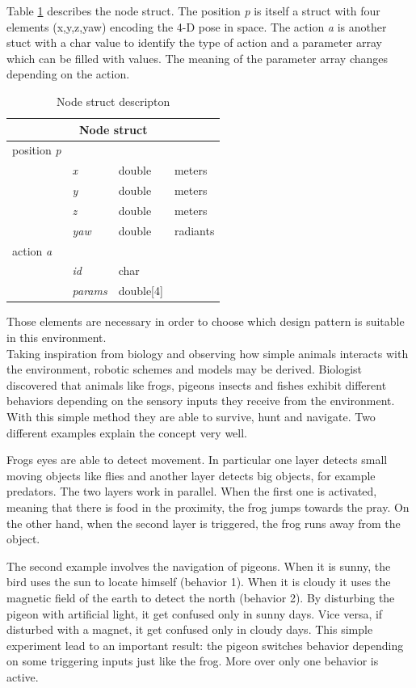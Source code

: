 Table \ref{tab:node} describes the node struct. The position \textit{p} is itself a struct with four elements (x,y,z,yaw) encoding the 4-D pose in space. The action \textit{a} is another stuct with a char value to identify the type of action and a parameter array which can be filled with values. The meaning of the parameter array changes depending on the action.
\begin{table}[h]
\centering
\begin{tabular}{llll}
\multicolumn{4}{c}{\textbf{Node} struct} \\
\hline
position \textit{p} &     &       &           \\
           & \textit{x}   & double & meters    \\
           & \textit{y}   & double & meters    \\
           & \textit{z}   & double & meters    \\
           & \textit{yaw} & double & radiants  \\ \hline
action \textit{a}   &     &       &           \\
           & \textit{id}  & char  &           \\
           & \textit{params}    &  double[4]     & \\
\end{tabular}
\label{tab:node}
\caption{Node struct descripton}
\end{table}
Those elements are necessary in order to choose which design pattern is suitable in this environment.
\newline \\
\noindent
Taking inspiration from biology and observing how simple animals interacts with the environment, robotic schemes and models may be derived. Biologist discovered that animals like frogs, pigeons insects and fishes exhibit different behaviors depending on the sensory inputs they receive from the environment. With this simple method they are able to survive, hunt and navigate. Two different examples explain the concept very well.

Frogs eyes are able to detect movement. In particular one layer detects small moving objects like flies and another layer detects big objects, for example predators. The two layers work in parallel. When the first one is activated, meaning that there is food in the proximity, the frog jumps towards the pray. On the other hand, when the second layer is triggered, the frog runs away from the object. 

The second example involves the navigation of pigeons. When it is sunny, the bird uses the sun to locate himself (behavior 1). When it is cloudy it uses the magnetic field of the earth to detect the north (behavior 2). By disturbing the pigeon with artificial light, it get confused only in sunny days. Vice versa, if disturbed with a magnet, it get confused only in cloudy days. This simple experiment lead to an important result: the pigeon switches behavior depending on some triggering inputs just like the frog. More over only one behavior is active. 
